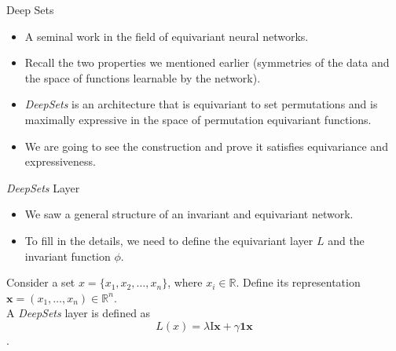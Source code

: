\documentclass{beamer}
\begin{document}
\begin{frame}{Deep Sets}

    \begin{itemize}
        \setlength{\itemsep}{\fill}
        \item A seminal work in the field of equivariant neural networks. 
        \pause
        \item Recall the two properties we mentioned earlier (symmetries of the data and the space of functions learnable by the network).
        \pause
        \item \emph{DeepSets} is an architecture that is equivariant to set permutations and is maximally expressive in the space of permutation equivariant functions.
        \pause
        \item We are going to see the construction and prove it satisfies equivariance and expressiveness.
    \end{itemize}
    
\end{frame}
\begin{frame}{\emph{DeepSets} Layer}

    \begin{itemize}
        \setlength{\itemsep}{\fill}
        \item We saw a general structure of an invariant and equivariant network.
        \item To fill in the details, we need to define the equivariant layer $L$ and the invariant function $\phi$.
    \end{itemize}

    \pause
    \begin{definition}
        Consider a set $x = \{x_1, x_2, \ldots, x_n\}$, where $x_i \in \mathbb{R}$. Define its representation $\mathbf{x} = (x_1, \dots, x_n) \in \mathbb{R}^n$.\\
        A \emph{DeepSets} layer is defined as 
        \[L(x) = \lambda\mathrm{I}\mathbf{x} + \gamma\mathbf{1}\mathbf{x}\].
    \end{definition}
    
\end{frame}
\end{document}
